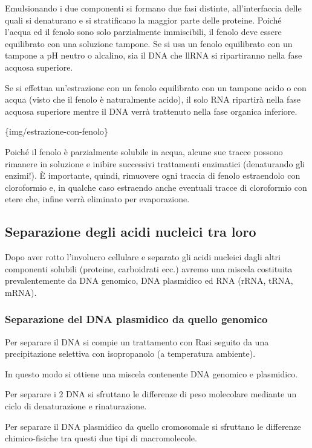 \documentclass[11pt]{book}
\begin{document}
Emulsionando i due componenti si formano due fasi distinte,
all'interfaccia delle quali si denaturano e si stratificano la maggior
parte delle proteine. Poiché l'acqua ed il fenolo sono solo parzialmente
immiscibili, il fenolo deve essere equilibrato con una soluzione
tampone. Se si usa un fenolo equilibrato con un tampone a pH neutro o
alcalino, sia il DNA che llRNA si ripartiranno nella fase acquosa
superiore.

Se si effettua un'estrazione con un fenolo equilibrato con un tampone
acido o con acqua (visto che il fenolo è naturalmente acido), il solo
RNA ripartirà nella fase acquosa superiore mentre il DNA verrà
trattenuto nella fase organica inferiore.

\{img/estrazione-con-fenolo\}

Poiché il fenolo è parzialmente solubile in acqua, alcune sue tracce
possono rimanere in soluzione e inibire successivi trattamenti
enzimatici (denaturando gli enzimi!). È importante, quindi, rimuovere
ogni traccia di fenolo estraendolo con cloroformio e, in qualche caso
estraendo anche eventuali tracce di cloroformio con etere che, infine
verrà eliminato per evaporazione.

\subsection{Separazione degli acidi nucleici tra
loro}\label{separazione-degli-acidi-nucleici-tra-loro}

Dopo aver rotto l'involucro cellulare e separato gli acidi nucleici
dagli altri componenti solubili (proteine, carboidrati ecc.) avremo una
miscela costituita prevalentemente da DNA genomico, DNA plasmidico ed
RNA (rRNA, tRNA, mRNA).

\subsubsection{Separazione del DNA plasmidico da quello
genomico}\label{separazione-del-dna-plasmidico-da-quello-genomico}

Per separare il DNA si compie un trattamento con Rasi seguito da una
precipitazione selettiva con isopropanolo (a temperatura ambiente).

In questo modo si ottiene una miscela contenente DNA genomico e
plasmidico.

Per separare i 2 DNA si sfruttano le differenze di peso molecolare
mediante un ciclo di denaturazione e rinaturazione.

Per separare il DNA plasmidico da quello cromosomale si sfruttano le
differenze chimico-fisiche tra questi due tipi di macromolecole.
\end{document}
